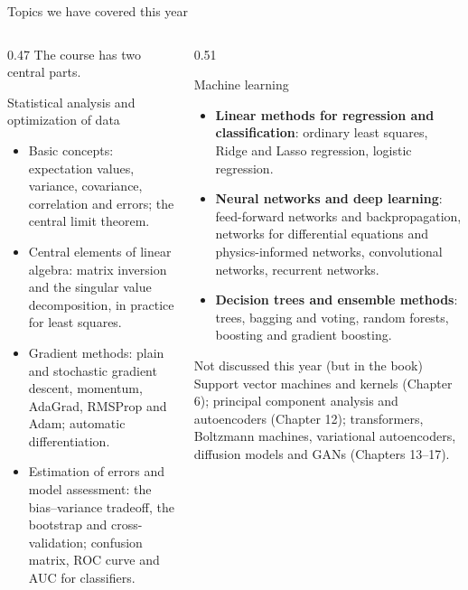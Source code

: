 \documentclass[10pt,aspectratio=169]{beamer}
\begin{document}
\begin{frame}{Topics we have covered this year}
\begin{columns}[T]
\begin{column}{0.47\textwidth}
\small The course has two central parts.
\begin{block}{Statistical analysis and optimization of data}
\footnotesize
\begin{itemize}
  \item Basic concepts: expectation values, variance, covariance,
    correlation and errors; the central limit theorem.
  \item Central elements of linear algebra: matrix inversion and the
    singular value decomposition, in practice for least squares.
  \item Gradient methods: plain and stochastic gradient descent, momentum,
    AdaGrad, RMSProp and Adam; automatic differentiation.
  \item Estimation of errors and model assessment: the bias--variance
    tradeoff, the bootstrap and cross-validation; confusion matrix, ROC
    curve and AUC for classifiers.
\end{itemize}
\end{block}
\end{column}
\begin{column}{0.51\textwidth}
\begin{block}{Machine learning}
\footnotesize
\begin{itemize}
  \item \textbf{Linear methods for regression and classification}: ordinary
    least squares, Ridge and Lasso regression, logistic regression.
  \item \textbf{Neural networks and deep learning}: feed-forward networks
    and backpropagation, networks for differential equations and
    physics-informed networks, convolutional networks, recurrent networks.
  \item \textbf{Decision trees and ensemble methods}: trees, bagging and
    voting, random forests, boosting and gradient boosting.
\end{itemize}
\end{block}
\begin{block}{Not discussed this year (but in the book)}
\footnotesize
Support vector machines and kernels (Chapter 6); principal component
analysis and autoencoders (Chapter 12); transformers, Boltzmann machines,
variational autoencoders, diffusion models and GANs (Chapters 13--17).
\end{block}
\end{column}
\end{columns}
\end{frame}
\end{document}

